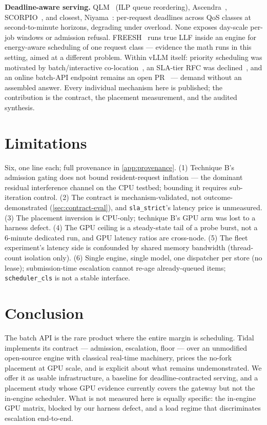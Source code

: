 \documentclass[conference]{IEEEtran}
\newcommand{\code}[1]{\texttt{#1}}
\begin{document}
\textbf{Deadline-aware serving.} QLM~\citep{qlm} (ILP queue reordering),
Ascendra~\citep{ascendra}, SCORPIO~\citep{scorpio}, and closest,
Niyama~\citep{niyama}: per-request deadlines across QoS classes at second-to-minute
horizons, degrading under overload. None exposes day-scale per-job windows or admission
refusal. FREESH~\citep{freesh} runs true LLF inside an engine for energy-aware
scheduling of one request class --- evidence the math runs in this setting, aimed at a
different problem. Within vLLM itself: priority scheduling was motivated by
batch/interactive co-location~\citep{vllm-rfc-6077}, an SLA-tier RFC was
declined~\citep{vllm-rfc-30256}, and an online batch-API endpoint remains an open
PR~\citep{vllm-pr-44445} --- demand without an assembled answer. Every individual
mechanism here is published; the contribution is the contract, the placement
measurement, and the audited synthesis.

\section{Limitations}
\label{sec:limitations}

Six, one line each; full provenance in \cref{app:provenance}.
(1) Technique B's admission gating does not bound resident-request inflation --- the
dominant residual interference channel on the CPU testbed; bounding it requires
sub-iteration control. (2) The contract is mechanism-validated, not
outcome-demonstrated (\cref{sec:contract-eval}), and \code{sla\_strict}'s latency price
is unmeasured. (3) The placement inversion is CPU-only; technique B's GPU arm was lost
to a harness defect. (4) The GPU ceiling is a steady-state tail of a probe burst, not a
6-minute dedicated run, and GPU latency ratios are cross-node. (5) The fleet experiment's
latency side is confounded by shared memory bandwidth (thread-count isolation only).
(6) Single engine, single model, one dispatcher per store (no lease);
submission-time escalation cannot re-age already-queued items; \code{scheduler\_cls} is
not a stable interface.

\section{Conclusion}

The batch API is the rare product where the entire margin is scheduling. Tidal
implements its contract --- admission, escalation, floor --- over an unmodified
open-source engine with classical real-time machinery, prices the no-fork placement at
GPU scale, and is explicit about what remains undemonstrated. We offer it as usable
infrastructure, a baseline for deadline-contracted serving, and a placement study whose
GPU evidence currently covers the gateway but not the in-engine scheduler. What is not
measured here is equally specific: the in-engine GPU matrix, blocked by our harness
defect, and a load regime that discriminates escalation end-to-end.
\end{document}
